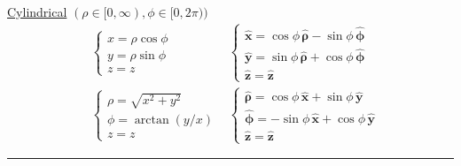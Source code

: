 \underline{Cylindrical}  $(\rho \in [0, \infty), \phi \in [0, 2\pi))$
\begin{align*}
&\begin{cases} 
x = \rho\cos\phi \\ 
y = \rho\sin\phi \\ 
z = z 
\end{cases} & 
\begin{cases} 
\mathbf{\hat{x}} = \cos\phi\,\bm{\hat{\rho}} - \sin\phi\,\bm{\hat{\phi}} \\ 
\mathbf{\hat{y}} = \sin\phi\,\bm{\hat{\rho}} + \cos\phi\,\bm{\hat{\phi}} \ \ \
\\ 
\mathbf{\hat{z}} = \mathbf{\hat{z}} 
\end{cases}
\\[0pt]
&\begin{cases} 
\rho = \sqrt{x^2+y^2} \\ 
\phi = \arctan(y/x) \\ 
z = z 
\end{cases}
&
\begin{cases} 
\bm{\hat{\rho}} = \cos\phi\,\mathbf{\hat{x}} + \sin\phi\,\mathbf{\hat{y}} \\ 
\bm{\hat{\phi}} = -\sin\phi\,\mathbf{\hat{x}} + \cos\phi\,\mathbf{\hat{y}} \\ 
\mathbf{\hat{z}} = \mathbf{\hat{z}} 
\end{cases}
\end{align*}



\hrule

